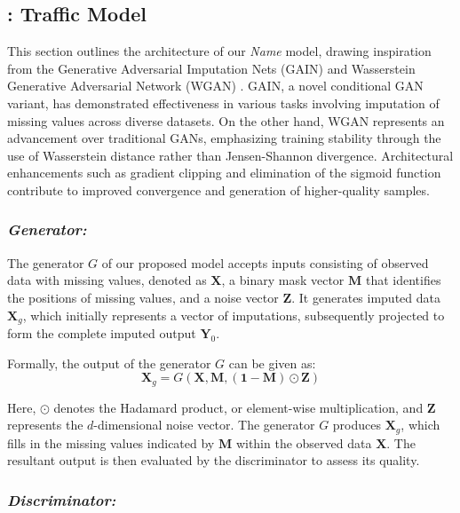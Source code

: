 \subsection{\name: Traffic Model}

This section outlines the architecture of our \textit{Name} model, drawing inspiration from the Generative Adversarial Imputation Nets (GAIN) \cite{gain} and Wasserstein Generative Adversarial Network (WGAN) \cite{wgan}. GAIN, a novel conditional GAN variant, has demonstrated effectiveness in various tasks involving imputation of missing values across diverse datasets. On the other hand, WGAN represents an advancement over traditional GANs, emphasizing training stability through the use of Wasserstein distance rather than Jensen-Shannon divergence. Architectural enhancements such as gradient clipping and elimination of the sigmoid function contribute to improved convergence and generation of higher-quality samples.

\subsubsection{\textit{Generator:}}

The generator \( G \) of our proposed model accepts inputs consisting of observed data with missing values, denoted as \( \mathbf{X} \), a binary mask vector \( \mathbf{M} \) that identifies the positions of missing values, and a noise vector \( \mathbf{Z} \). It generates imputed data \( \mathbf{X}_g \), which initially represents a vector of imputations, subsequently projected to form the complete imputed output \( \mathbf{Y}_0 \).

Formally, the output of the generator \( G \) can be given as: 
\[ \mathbf{X}_g = G(\mathbf{X}, \mathbf{M}, (\mathbf{1}-\mathbf{M}) \odot \mathbf{Z}) \]

Here, \( \odot \) denotes the Hadamard product, or element-wise multiplication, and \( \mathbf{Z} \) represents the \( d \)-dimensional noise vector. The generator \( G \) produces \( \mathbf{X}_g \), which fills in the missing values indicated by \( \mathbf{M} \) within the observed data \( \mathbf{X} \). The resultant output is then evaluated by the discriminator to assess its quality.


\subsubsection{\textit{Discriminator:}}

